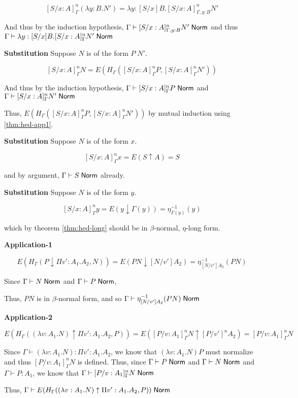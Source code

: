 \[
[S/x : A]_{\Gamma}^n (\lambda y : B . N') 
= \lambda y : [S / x] B . [S / x : A]^n_{\Gamma, y : B} N'
\]

And thus by the induction hypothesis, 
$\Gamma \vdash [S / x : A]^n_{\Gamma, y : B} N' \; \mathsf{Norm}$
and thus
$\Gamma \vdash  \lambda y : [S / x] B . [S/x : A]_{\Gamma}^n N' \; \mathsf{Norm}$

\begin{tcases}
\textbf{Substitution} Suppose $N$ is of the form $P \; N'$.
\end{tcases}

\[
[S/x : A]_{\Gamma}^n N 
= E( H_\Gamma([S/x : A]_{\Gamma}^n P, [S/x : A]_{\Gamma}^n N') )
\]

And thus by the induction hypothesis, 
$\Gamma \vdash [S/x : A]_{\Gamma}^n P \; \mathsf{Norm}$
and
$\Gamma \vdash  [S/x : A]_{\Gamma}^n N' \; \mathsf{Norm}$

Thus, $E( H_\Gamma([S/x : A]_{\Gamma}^n P, [S/x : A]_{\Gamma}^n N') )$ by 
mutual induction using \ref{thm:hed-app1}.

\begin{tcases}
\textbf{Substitution} Suppose $N$ is of the form $x$.
\end{tcases}

\[
[S/x : A]_{\Gamma}^n x 
= E( S \uparrow A)
= S
\]

and by argument, $\Gamma \vdash S\; \mathsf{Norm}$ already.

\begin{tcases}
\textbf{Substitution} Suppose $N$ is of the form $y$.
\end{tcases}

\[
[S/x : A]_{\Gamma}^n y 
= E( y \downarrow \Gamma(y))
= \eta_{\Gamma(y)}^{-1}(y)
\]

which by theorem \ref{thm:hed-long} should be in $\beta$-normal, $\eta$-long form.

\begin{tcases}
\textbf{Application-1} 
\end{tcases}

\[
E(H_\Gamma(P \downarrow \Pi v' : A_1 . A_2 , N))
= 
E(P N \downarrow [N/v'] A_2)
=
\eta_{[N/v'] A_2}^{-1}(P N)
\]

Since $\Gamma \vdash N \; \mathsf{Norm}$ and $\Gamma \vdash P \; \mathsf{Norm}$, 

Thus, $P N$ is in $\beta$-normal form, and so 
$\Gamma \vdash \eta_{[N/v'] A_2}^{-1}(P N) \; \mathsf{Norm}$

\begin{tcases}
\textbf{Application-2} 
\end{tcases}

\[
E(H_\Gamma((\lambda v : A_1 . N) \uparrow \Pi v' : A_1 . A_2 , P))
=
E( [ P / v : A_1 ]_\Gamma^n N \uparrow [ P / v' ]^n A_2)
=
[P / v : A_1 ]_\Gamma^n N
\]

Since $\Gamma \vdash (\lambda v : A_1 . N) : \Pi v' : A_1 . A_2$, we know that
$(\lambda v : A_1 . N) P$ must normalize and thus $[P/ v : A_1 ]_\Gamma^n N$ is defined.
Thus, since $\Gamma \vdash P \; \mathsf{Norm}$ and $\Gamma \vdash N \; \mathsf{Norm}$ and 
$\Gamma \vdash P : A_1$, we know that
$\Gamma \vdash [P/ v : A_1 ]_\Gamma^n N \; \mathsf{Norm}$

Thus, 
$\Gamma \vdash E(H_\Gamma((\lambda v : A_1 . N) \uparrow \Pi v' : A_1 . A_2 , P)) \; \mathsf{Norm}$
